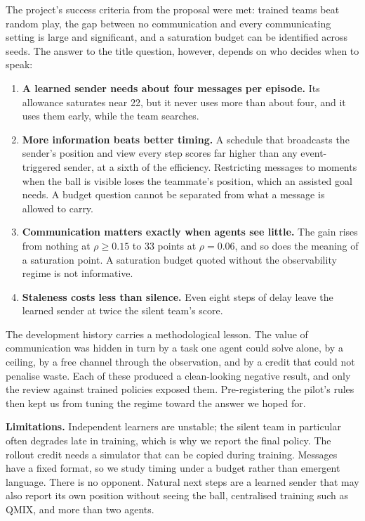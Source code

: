 \documentclass[twocolumn]{article}
\begin{document}
The project's success criteria from the proposal were met: trained teams beat random play, the gap
between no communication and every communicating setting is large and significant, and a saturation
budget can be identified across seeds. The answer to the title question, however, depends on who
decides when to speak:
\begin{enumerate}
\item \textbf{A learned sender needs about four messages per episode.} Its allowance saturates near 22,
but it never uses more than about four, and it uses them early, while the team searches.
\item \textbf{More information beats better timing.} A schedule that broadcasts the sender's position
and view every step scores far higher than any event-triggered sender, at a sixth of the efficiency.
Restricting messages to moments when the ball is visible loses the teammate's position, which an
assisted goal needs. A budget question cannot be separated from what a message is allowed to carry.
\item \textbf{Communication matters exactly when agents see little.} The gain rises from nothing at
$\rho\ge0.15$ to 33 points at $\rho=0.06$, and so does the meaning of a saturation point. A saturation
budget quoted without the observability regime is not informative.
\item \textbf{Staleness costs less than silence.} Even eight steps of delay leave the learned sender
at twice the silent team's score.
\end{enumerate}

The development history carries a methodological lesson. The value of communication was hidden in
turn by a task one agent could solve alone, by a ceiling, by a free channel through the observation,
and by a credit that could not penalise waste. Each of these produced a clean-looking negative result,
and only the review against trained policies exposed them. Pre-registering the pilot's rules then
kept us from tuning the regime toward the answer we hoped for.

\textbf{Limitations.} Independent learners are unstable; the silent team in particular often degrades
late in training, which is why we report the final policy. The rollout credit needs a simulator that
can be copied during training. Messages have a fixed format, so we study timing under a budget rather
than emergent language. There is no opponent. Natural next steps are a learned sender that may also
report its own position without seeing the ball, centralised training such as QMIX, and more than two
agents.
\end{document}
